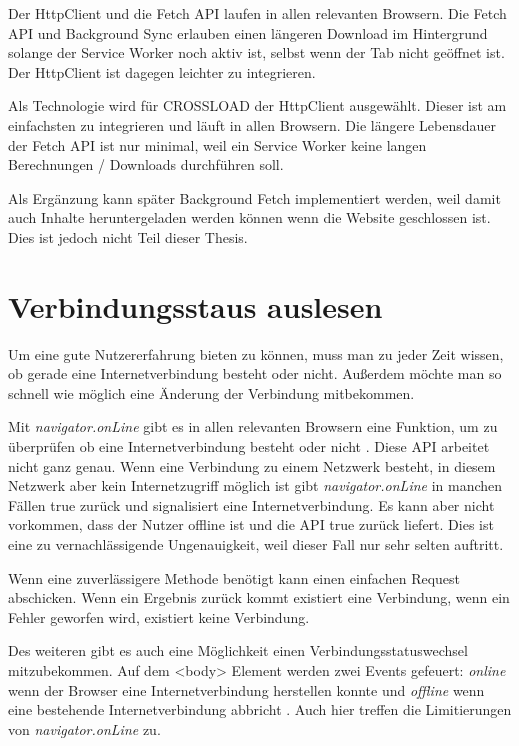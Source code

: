 Der HttpClient und die Fetch \ac{API} laufen in allen relevanten Browsern. Die Fetch \ac{API} und Background Sync erlauben einen längeren Download im Hintergrund solange der Service Worker noch aktiv ist, selbst wenn der Tab nicht geöffnet ist. Der HttpClient ist dagegen leichter zu integrieren.

Als Technologie wird für CROSSLOAD der HttpClient ausgewählt. Dieser ist am einfachsten zu integrieren und läuft in allen Browsern. Die längere Lebensdauer der Fetch \ac{API} ist nur minimal, weil ein Service Worker keine langen Berechnungen / Downloads durchführen soll.

Als Ergänzung kann später Background Fetch implementiert werden, weil damit auch Inhalte heruntergeladen werden können wenn die Website geschlossen ist. Dies ist jedoch nicht Teil dieser Thesis.

\section{Verbindungsstaus auslesen}
Um eine gute Nutzererfahrung bieten zu können, muss man zu jeder Zeit wissen, ob gerade eine Internetverbindung besteht oder nicht. Außerdem möchte man so schnell wie möglich eine Änderung der Verbindung mitbekommen.

Mit \emph{navigator.onLine} gibt es in allen relevanten Browsern \autocite{caniuse-online} eine Funktion, um zu überprüfen ob eine Internetverbindung besteht oder nicht \autocite{Sheppard2017} \autocite{mdn-online}. Diese \ac{API} arbeitet nicht ganz genau. Wenn eine Verbindung zu einem Netzwerk besteht, in diesem Netzwerk aber kein Internetzugriff möglich ist gibt \emph{navigator.onLine} in manchen Fällen true zurück und signalisiert eine Internetverbindung\autocite{Sheppard2017}. Es kann aber nicht vorkommen, dass der Nutzer offline ist und die \ac{API} true zurück liefert. Dies ist eine zu vernachlässigende Ungenauigkeit, weil dieser Fall nur sehr selten auftritt. 

Wenn eine zuverlässigere Methode benötigt kann einen einfachen Request abschicken. Wenn ein Ergebnis zurück kommt existiert eine Verbindung, wenn ein Fehler geworfen wird, existiert keine Verbindung. 

Des weiteren gibt es auch eine Möglichkeit einen Verbindungsstatuswechsel mitzubekommen. Auf dem <body> Element werden zwei Events gefeuert: \emph{online} wenn der Browser eine Internetverbindung herstellen konnte und \emph{offline} wenn eine bestehende Internetverbindung abbricht \autocite{mdn-online}. Auch hier treffen die Limitierungen von \emph{navigator.onLine} zu.
